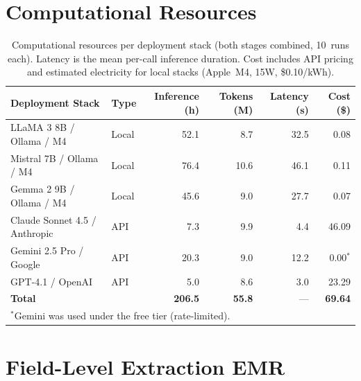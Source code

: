 \documentclass[11pt]{article}
\newenvironment{fittab}{\begin{lrbox}{\fittabbox}}{\end{lrbox}%
  \ifdim\wd\fittabbox>\linewidth\resizebox{\linewidth}{!}{\usebox{\fittabbox}}\else\usebox{\fittabbox}\fi}
\begin{document}
\section{Computational Resources}

\begin{table}[htbp]
\centering
\caption{Computational resources per deployment stack (both stages combined, 10~runs each). Latency is the mean per-call inference duration. Cost includes API pricing and estimated electricity for local stacks (Apple~M4, 15W, \$0.10/kWh).}
\label{tab:resources}
\small
\begin{fittab}\begin{tabular}{llrrrr}
\toprule
\textbf{Deployment Stack} & \textbf{Type} & \textbf{Inference (h)} & \textbf{Tokens (M)} & \textbf{Latency (s)} & \textbf{Cost (\$)} \\
\midrule
LLaMA 3 8B / Ollama / M4       & Local  & 52.1  & 8.7  & 32.5  & 0.08 \\
Mistral 7B / Ollama / M4       & Local  & 76.4  & 10.6 & 46.1  & 0.11 \\
Gemma 2 9B / Ollama / M4       & Local  & 45.6  & 9.0  & 27.7  & 0.07 \\
\midrule
Claude Sonnet 4.5 / Anthropic  & API & 7.3   & 9.9  & 4.4   & 46.09 \\
Gemini 2.5 Pro / Google        & API & 20.3  & 9.0  & 12.2  & 0.00$^{*}$ \\
GPT-4.1 / OpenAI               & API & 5.0   & 8.6  & 3.0   & 23.29 \\
\midrule
\textbf{Total}    &        & \textbf{206.5} & \textbf{55.8} & --- & \textbf{69.64} \\
\bottomrule
\multicolumn{6}{l}{\footnotesize $^{*}$Gemini was used under the free tier (rate-limited).}
\end{tabular}\end{fittab}
\end{table}


\section{Field-Level Extraction EMR}
\end{document}
